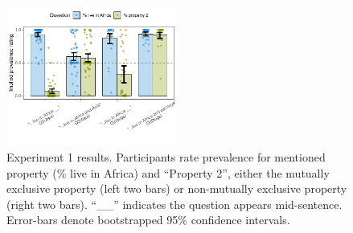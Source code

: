 \documentclass[10pt,letterpaper]{article}
\begin{document}
%
%




\begin{figure}[h]
  \centering
    \includegraphics[width=0.5\textwidth]{expt2_summary}
  \caption{Experiment 1 results.  Participants rate prevalence for mentioned property (\% live in Africa) and ``Property 2'', either the mutually exclusive property (left two bars) or non-mutually exclusive property (right two bars). ``\_\_'' indicates the question appears mid-sentence. Error-bars denote bootstrapped 95\% confidence intervals.}
  \label{fig:expt2}
  \end{figure}
\end{document}
